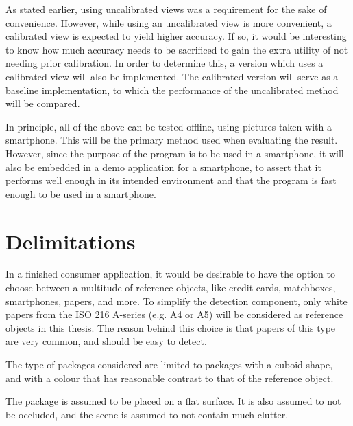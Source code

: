 As stated earlier, using uncalibrated views was a requirement for the sake of convenience.
However, while using an uncalibrated view is more convenient, a calibrated view is expected to yield higher accuracy.
If so, it would be interesting to know how much accuracy needs to be sacrificed to gain the extra utility of not needing prior calibration.
In order to determine this, a version which uses a calibrated view will also be implemented.
The calibrated version will serve as a baseline implementation, to which the performance of the uncalibrated method will be compared.

In principle, all of the above can be tested offline, using pictures taken with a smartphone.
This will be the primary method used when evaluating the result.
However, since the purpose of the program is to be used in a smartphone, it will also be embedded in a demo application for a smartphone, to assert that it performs well enough in its intended environment and that the program is fast enough to be used in a smartphone.

\section{Delimitations} \label{introduction:delimitations}
In a finished consumer application, it would be desirable to have the option to choose between a multitude of reference objects, like credit cards, matchboxes, smartphones, papers, and more. 
To simplify the detection component, only white papers from the ISO 216 A-series (e.g. A4 or A5) will be considered as reference objects in this thesis.
The reason behind this choice is that papers of this type are very common, and should be easy to detect.

The type of packages considered are limited to packages with a cuboid shape, and with a colour that has reasonable contrast to that of the reference object.

The package is assumed to be placed on a flat surface.
It is also assumed to not be occluded, and the scene is assumed to not contain much clutter.